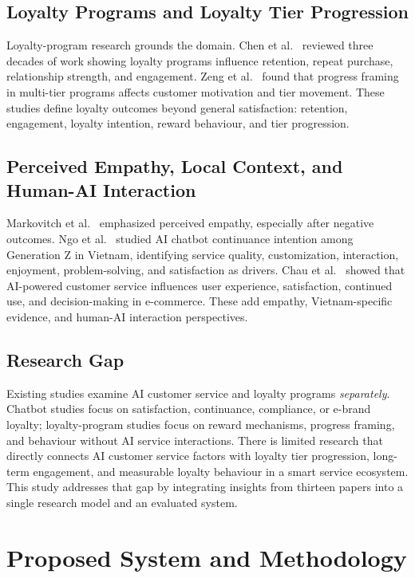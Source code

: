 \documentclass[runningheads]{llncs}
\begin{document}
\subsection{Loyalty Programs and Loyalty Tier Progression}
Loyalty-program research grounds the domain. Chen et al.~\cite{ref09} reviewed three decades of work showing loyalty programs influence retention, repeat purchase, relationship strength, and engagement. Zeng et al.~\cite{ref10} found that progress framing in multi-tier programs affects customer motivation and tier movement. These studies define loyalty outcomes beyond general satisfaction: retention, engagement, loyalty intention, reward behaviour, and tier progression.

\subsection{Perceived Empathy, Local Context, and Human-AI Interaction}
Markovitch et al.~\cite{ref11} emphasized perceived empathy, especially after negative outcomes. Ngo et al.~\cite{ref12} studied AI chatbot continuance intention among Generation Z in Vietnam, identifying service quality, customization, interaction, enjoyment, problem-solving, and satisfaction as drivers. Chau et al.~\cite{ref13} showed that AI-powered customer service influences user experience, satisfaction, continued use, and decision-making in e-commerce. These add empathy, Vietnam-specific evidence, and human-AI interaction perspectives.

\subsection{Research Gap}
Existing studies examine AI customer service and loyalty programs \emph{separately}. Chatbot studies focus on satisfaction, continuance, compliance, or e-brand loyalty; loyalty-program studies focus on reward mechanisms, progress framing, and behaviour without AI service interactions. There is limited research that directly connects AI customer service factors with loyalty tier progression, long-term engagement, and measurable loyalty behaviour in a smart service ecosystem. This study addresses that gap by integrating insights from thirteen papers into a single research model and an evaluated system.

\section{Proposed System and Methodology}
\end{document}
